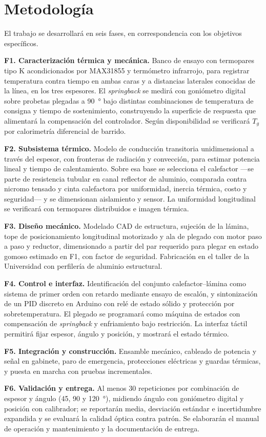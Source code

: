 \section{Metodología}

El trabajo se desarrollará en seis fases, en correspondencia con los objetivos específicos.

\noindent\textbf{F1. Caracterización térmica y mecánica.} Banco de ensayo con termopares tipo K acondicionados por MAX31855 y termómetro infrarrojo, para registrar temperatura contra tiempo en ambas caras y a distancias laterales conocidas de la línea, en los tres espesores. El \emph{springback} se medirá con goniómetro digital sobre probetas plegadas a \SI{90}{\degree} bajo distintas combinaciones de temperatura de consigna y tiempo de sostenimiento, construyendo la superficie de respuesta que alimentará la compensación del controlador. Según disponibilidad se verificará $T_g$ por calorimetría diferencial de barrido.

\noindent\textbf{F2. Subsistema térmico.} Modelo de conducción transitoria unidimensional a través del espesor, con fronteras de radiación y convección, para estimar potencia lineal y tiempo de calentamiento. Sobre esa base se selecciona el calefactor —se parte de resistencia tubular en canal reflector de aluminio, comparada contra nicromo tensado y cinta calefactora por uniformidad, inercia térmica, costo y seguridad— y se dimensionan aislamiento y sensor. La uniformidad longitudinal se verificará con termopares distribuidos e imagen térmica.

\noindent\textbf{F3. Diseño mecánico.} Modelado CAD de estructura, sujeción de la lámina, tope de posicionamiento longitudinal motorizado y ala de plegado con motor paso a paso y reductor, dimensionado a partir del par requerido para plegar en estado gomoso estimado en F1, con factor de seguridad. Fabricación en el taller de la Universidad con perfilería de aluminio estructural.

\noindent\textbf{F4. Control e interfaz.} Identificación del conjunto calefactor--lámina como sistema de primer orden con retardo mediante ensayo de escalón, y sintonización de un PID discreto en Arduino con relé de estado sólido y protección por sobretemperatura. El plegado se programará como máquina de estados con compensación de \emph{springback} y enfriamiento bajo restricción. La interfaz táctil permitirá fijar espesor, ángulo y posición, y mostrará el estado térmico.

\noindent\textbf{F5. Integración y construcción.} Ensamble mecánico, cableado de potencia y señal en gabinete, paro de emergencia, protecciones eléctricas y guardas térmicas, y puesta en marcha con pruebas incrementales.

\noindent\textbf{F6. Validación y entrega.} Al menos \num{30} repeticiones por combinación de espesor y ángulo (\num{45}, \num{90} y \SI{120}{\degree}), midiendo ángulo con goniómetro digital y posición con calibrador; se reportarán media, desviación estándar e incertidumbre expandida y se evaluará la calidad óptica contra patrón. Se elaborarán el manual de operación y mantenimiento y la documentación de entrega.
